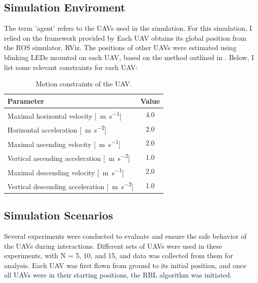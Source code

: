     \subsection{Simulation Enviroment}
        The term 'agent' refers to the \ac{UAV}s used in the simulation.
        For this simulation, I relied on the framework provided by \cite{mrs_uav_system}
        Each \ac{UAV} obtains its global position from the ROS simulator, RViz.
        The positions of other \ac{UAV}s were estimated using blinking LEDs mounted on each \ac{UAV}, based on the method outlined in \cite{uvdd1}.
        Below, I list some relevant constraints for each \ac{UAV}:
        \begin{table}[h]
            \centering
            \renewcommand{\arraystretch}{1.1}
            \begin{tabular}{|l|c|}
                \hline
                \textbf{Parameter} & \textbf{Value} \\ \hline
                    Maximal horizontal velocity [\SI{}{\meter\per\second}] & 4.0 \\ \hline
                    Horizontal acceleration [\SI{}{\meter\per\second\squared}] & 2.0 \\ \hline
                    Maximal ascending velocity [\SI{}{\meter\per\second}] & 2.0 \\ \hline
                    Vertical ascending acceleration [\SI{}{\meter\per\second\squared}] & 1.0 \\ \hline
                    Maximal descending velocity [\SI{}{\meter\per\second}] & 2.0 \\ \hline
                    Vertical descending acceleration [\SI{}{\meter\per\second\squared}] & 1.0 \\ \hline
                \end{tabular}
                \caption{Motion constraints of the \ac{UAV}.}
            \label{tab:uav_constraints}
        \end{table}
    \subsection{Simulation Scenarios}
        Several experiments were conducted to evaluate and ensure the safe behavior of the \ac{UAV}s during interactions. 
        Different sets of \ac{UAV}s were used in these experiments, with N = 5, 10, and 15, and data was collected from them for analysis. 
        Each \ac{UAV} was first flown from ground to its initial position, and once all \ac{UAV}s were in their starting positions, the RBL algorithm was initiated.

